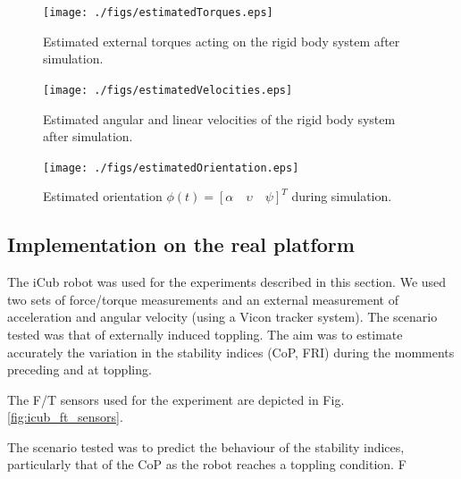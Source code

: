 \documentclass[letterpaper, 10 pt, conference]{ieeeconf}  %
\begin{document}
\begin{figure}[t!]
 \centering
 \texttt{[image: ./figs/estimatedTorques.eps]}
 \caption{Estimated external torques acting on the rigid body system after simulation.}
 \label{fig:estimatedTorques}
\end{figure}

\begin{figure}[t!]
 \centering
 \texttt{[image: ./figs/estimatedVelocities.eps]}
 \caption{Estimated angular and linear velocities of the rigid body system after simulation.}
 \label{fig:estimatedVelocities}
\end{figure}

\begin{figure}[t!]
 \centering
 \texttt{[image: ./figs/estimatedOrientation.eps]}
 \caption{Estimated orientation $\phi(t) = [\alpha \quad \upsilon \quad \psi]^T$ during simulation.}
 \label{fig:estimatedOrientation}
\end{figure}

\subsection{Implementation on the real platform}

The iCub robot was used for the experiments described in this section. We used two sets of force/torque measurements and an external measurement of acceleration and angular velocity (using a Vicon tracker system). The scenario tested was that of externally induced toppling. The aim was to estimate accurately the variation in the stability indices (CoP, FRI) during the momments preceding and at toppling. 

The F/T sensors used for the experiment are depicted in Fig. \ref{fig:icub_ft_sensors}. 

The scenario tested was to predict the behaviour of the stability indices, particularly that of the CoP as the robot reaches a toppling condition.  F
\end{document}
